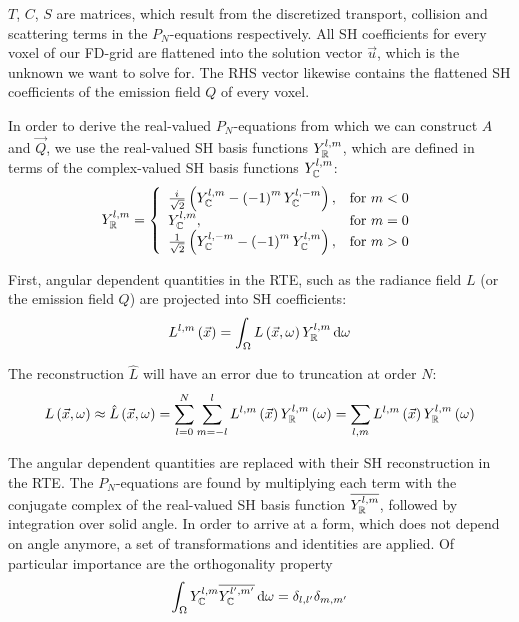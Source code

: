 $T$, $C$, $S$ are matrices, which result from the discretized transport, collision and scattering terms in the $P_N$-equations respectively. All SH coefficients for every voxel of our FD-grid are flattened into the solution vector $\vec{u}$, which is the unknown we want to solve for. The RHS vector likewise contains the flattened SH coefficients of the emission field $Q$ of every voxel.

In order to derive the real-valued $P_N$-equations from which we can construct $A$ and $\vec{Q}$, we use the real-valued SH basis functions $Y_{\mathbb{R}}^{l,m}$, which are defined in terms of the complex-valued SH basis functions $Y_{\mathbb{C}}^{l,m}$:
\begin{align}
Y_{\mathbb{R}}^{l,m}=
\left\{
\begin{array}{lr}
\frac{{i\mkern1mu}}{\sqrt{2}}\left(Y_{\mathbb{C}}^{l,m}-\left(-1\right)^mY_{\mathbb{C}}^{l,-m}\right), & \text{for } m < 0\\
Y_{\mathbb{C}}^{l,m}, & \text{for } m = 0\\
\frac{1}{\sqrt{2}}\left(Y_{\mathbb{C}}^{l,-m}-\left(-1\right)^mY_{\mathbb{C}}^{l,m}\right), & \text{for } m > 0
\end{array}
\right.
\end{align}

First, angular dependent quantities in the RTE, such as the radiance field $L$ (or the emission field $Q$) are projected into SH coefficients:
\begin{align}
L^{l,m}\left(\vec{x}\right)
=
\int_\Omega{L\left(\vec{x}, \omega\right)Y_{\mathbb{R}}^{l,m}\,\mathrm{d}\omega}
\end{align}

The reconstruction $\hat{L}$ will have an error due to truncation at order $N$:
\begin{align}
L\left(\vec{x}, \omega\right)
\approx
\hat{L}\left(\vec{x}, \omega\right) =
\sum_{l=0}^{N}
{
\sum_{m=-l}^{l}
{
L^{l,m}\left(\vec{x}\right)Y_{\mathbb{R}}^{l,m}\left(\omega\right)
}
}
=
\sum_{l,m}
{
L^{l,m}\left(\vec{x}\right)Y_{\mathbb{R}}^{l,m}\left(\omega\right)
}
\end{align}

The angular dependent quantities are replaced with their SH reconstruction in the RTE. The $P_N$-equations are found by multiplying each term with the conjugate complex of the real-valued SH basis function $\overline{Y_{\mathbb{R}}^{l,m}}$, followed by integration over solid angle. In order to arrive at a form, which does not depend on angle anymore, a set of transformations and identities are applied. Of particular importance are the orthogonality property
\begin{align}
\int_{\Omega}{ Y_{\mathbb{C}}^{l,m}\overline{Y_{\mathbb{C}}^{l',m'}}\,\mathrm{d}\omega} = \delta_{l,l'}\delta_{m,m'}
\end{align}

